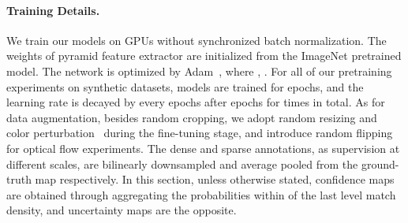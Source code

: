 \paragraph{Training Details.}
We train our models on  GPUs without synchronized batch normalization.
The weights of pyramid feature extractor are initialized from the ImageNet pretrained model.
The network is optimized by Adam~\cite{kingma2014adam}, where , . 
For all of our pretraining experiments on synthetic datasets, models are trained for  epochs, and the learning rate is decayed by  every  epochs after  epochs for  times in total.
As for data augmentation, besides random cropping, we adopt random resizing and color perturbation~\cite{Meister:2018:UUL} during the fine-tuning stage, and introduce random flipping for optical flow experiments. 
The dense and sparse annotations, as supervision at different scales, are bilinearly downsampled and average pooled from the ground-truth map respectively. 
In this section, unless otherwise stated, confidence maps are obtained through aggregating the probabilities within  of the last level match density, and uncertainty maps are the opposite.

